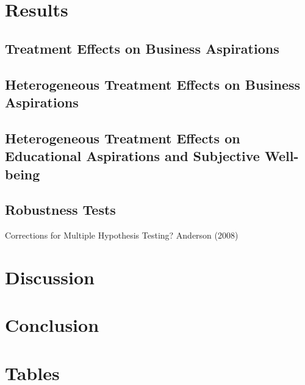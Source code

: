 \documentclass[11.5pt]{article}
\begin{document}
\section{Results}

\subsection{Treatment Effects on Business Aspirations}

\subsection{Heterogeneous Treatment Effects on Business Aspirations}

\subsection{Heterogeneous Treatment Effects on Educational Aspirations and Subjective Well-being}

\subsection{Robustness Tests}

Corrections for Multiple Hypothesis Testing? Anderson (2008)

\section{Discussion}

\section{Conclusion}




\pagebreak




\clearpage




\onehalfspacing
\section*{Tables} \label{sec:tab}
\end{document}

